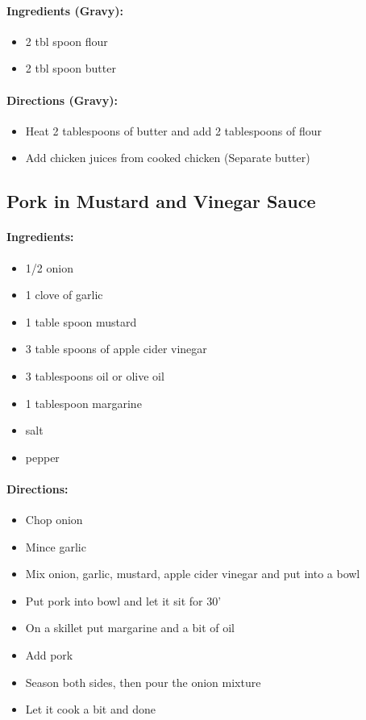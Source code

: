 \documentclass{article}
\begin{document}
\paragraph{Ingredients (Gravy):}
\begin{itemize}
	\item 2 tbl spoon flour
	\item 2 tbl spoon butter
\end{itemize}

\paragraph{Directions (Gravy):}
\begin{itemize}
	\item Heat 2 tablespoons of butter and add 2 tablespoons of flour
	\item Add chicken juices from cooked chicken (Separate butter)
\end{itemize}

\subsection{Pork in Mustard and Vinegar Sauce}

\paragraph{Ingredients:}

\begin{itemize}
	\item 1/2 onion
	\item 1 clove of garlic
	\item 1 table spoon mustard
	\item 3 table spoons of apple cider vinegar
	\item 3 tablespoons oil or olive oil
	\item 1 tablespoon margarine
	\item salt
	\item pepper
\end{itemize}

\paragraph{Directions:}
\begin{itemize}
	\item Chop onion
	\item Mince garlic
	\item Mix onion, garlic, mustard, apple cider vinegar and put into a bowl
	\item Put pork into bowl and let it sit for 30'
	\item On a skillet put margarine and a bit of oil
	\item Add pork
	\item Season both sides, then pour the onion mixture
	\item Let it cook a bit and done
\end{itemize}
\end{document}
